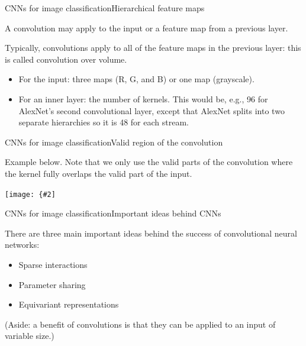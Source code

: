 \documentclass{beamer}
\newcommand{\myfig}[3]{\centerline{\texttt{[image: \{\#2]}}}
\begin{document}
\begin{frame}{CNNs for image classification}{Hierarchical feature maps}

  A convolution may apply to the \alert{input} or \alert{a feature map
    from a previous layer}.

  \medskip

  Typically, convolutions apply to all of the feature maps in the
  previous layer: this is called \alert{convolution over volume}.
  \begin{itemize}
  \item For the input: three maps (R, G, and B) or one map (grayscale).
  \item For an inner layer: the number of kernels. This would be,
    e.g., 96 for AlexNet's second convolutional layer, except that
    AlexNet splits into two separate hierarchies so it is 48 for each
    stream.
  \end{itemize}

\end{frame}


\begin{frame}{CNNs for image classification}{Valid region of the convolution}

Example below. Note that we only use the \alert{valid} parts of the
convolution where the kernel fully overlaps the valid part of the
input.

\myfig{2.2in}{goodfellow-fig9-1}{Goodfellow et al. (2016), Figure 9.1}

\end{frame}


\begin{frame}{CNNs for image classification}{Important ideas behind CNNs}

There are three main important ideas behind the success of
convolutional neural networks:
\begin{itemize}
\item Sparse interactions
\item Parameter sharing
\item Equivariant representations
\end{itemize}

(Aside: a benefit of convolutions is that they can be applied to an
input of variable size.)

\end{frame}
\end{document}
